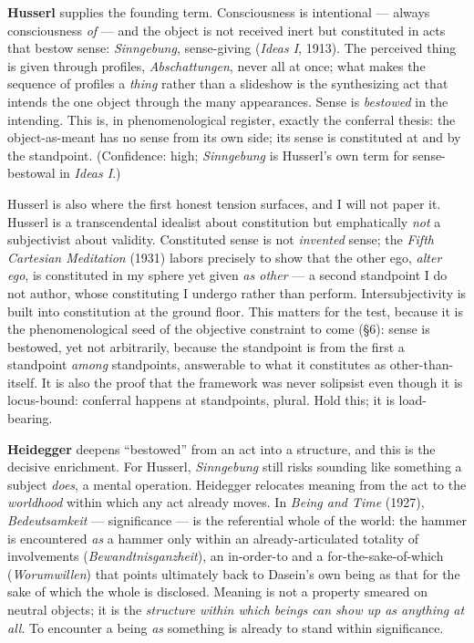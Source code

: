\documentclass[11pt]{article}
\begin{document}
\textbf{Husserl} supplies the founding term. Consciousness is intentional — always consciousness \emph{of} — and the object is not received inert but constituted in acts that bestow sense: \emph{Sinngebung}, sense-giving (\emph{Ideas I}, 1913). The perceived thing is given through profiles, \emph{Abschattungen}, never all at once; what makes the sequence of profiles a \emph{thing} rather than a slideshow is the synthesizing act that intends the one object through the many appearances. Sense is \emph{bestowed} in the intending. This is, in phenomenological register, exactly the conferral thesis: the object-as-meant has no sense from its own side; its sense is constituted at and by the standpoint. (Confidence: high; \emph{Sinngebung} is Husserl's own term for sense-bestowal in \emph{Ideas I}.)

Husserl is also where the first honest tension surfaces, and I will not paper it. Husserl is a transcendental idealist about constitution but emphatically \emph{not} a subjectivist about validity. Constituted sense is not \emph{invented} sense; the \emph{Fifth Cartesian Meditation} (1931) labors precisely to show that the other ego, \emph{alter ego}, is constituted in my sphere yet given \emph{as other} — a second standpoint I do not author, whose constituting I undergo rather than perform. Intersubjectivity is built into constitution at the ground floor. This matters for the test, because it is the phenomenological seed of the objective constraint to come (§6): sense is bestowed, yet not arbitrarily, because the standpoint is from the first a standpoint \emph{among} standpoints, answerable to what it constitutes as other-than-itself. It is also the proof that the framework was never solipsist even though it is locus-bound: conferral happens at standpoints, plural. Hold this; it is load-bearing.

\textbf{Heidegger} deepens ``bestowed'' from an act into a structure, and this is the decisive enrichment. For Husserl, \emph{Sinngebung} still risks sounding like something a subject \emph{does}, a mental operation. Heidegger relocates meaning from the act to the \emph{worldhood} within which any act already moves. In \emph{Being and Time} (1927), \emph{Bedeutsamkeit} — significance — is the referential whole of the world: the hammer is encountered \emph{as} a hammer only within an already-articulated totality of involvements (\emph{Bewandtnisganzheit}), an in-order-to and a for-the-sake-of-which (\emph{Worumwillen}) that points ultimately back to Dasein's own being as that for the sake of which the whole is disclosed. Meaning is not a property smeared on neutral objects; it is the \emph{structure within which beings can show up as anything at all}. To encounter a being \emph{as} something is already to stand within significance.
\end{document}
